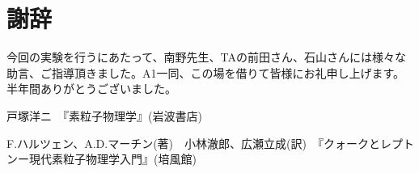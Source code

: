 \section*{謝辞}
今回の実験を行うにあたって、南野先生、TAの前田さん、石山さんには様々な助言、ご指導頂きました。A1一同、この場を借りて皆様にお礼申し上げます。半年間ありがとうございました。


\begin{thebibliography}{9}
\item 戸塚洋ニ　『素粒子物理学』(岩波書店)
\item F.ハルツェン、A.D.マーチン(著)　小林澈郎、広瀬立成(訳)　『クォークとレプトンー現代素粒子物理学入門』(培風館)
\end{thebibliography}
